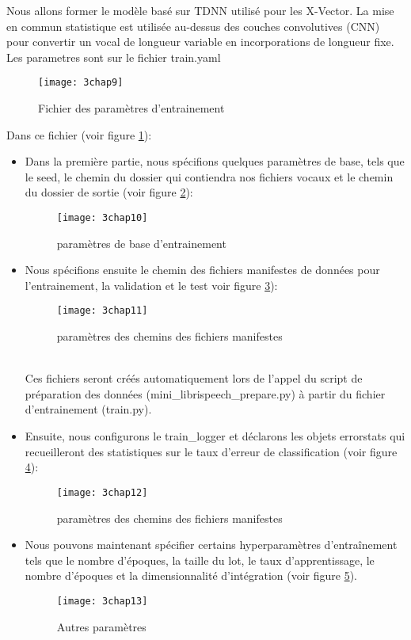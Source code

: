 Nous allons former le modèle basé sur TDNN utilisé pour les X-Vector. La mise en commun statistique est utilisée au-dessus des couches convolutives (CNN) pour convertir un vocal de longueur variable en incorporations de longueur fixe. Les parametres sont sur le fichier train.yaml

\begin{figure}[h]
    \centering
    \texttt{[image: 3chap9]}
    \caption{Fichier des paramètres d'entrainement}
    \label{fig:3chap9}
\end{figure}
Dans ce fichier  (voir figure \ref{fig:3chap9}):
\begin{itemize}
    \item Dans la première partie, nous spécifions quelques paramètres de base, tels que le seed, le chemin du dossier qui contiendra nos fichiers vocaux et le chemin du dossier de sortie (voir figure \ref{fig:3chap10}):
    \begin{figure}[h]
		\centering
		\texttt{[image: 3chap10]}
		\caption{paramètres de base d'entrainement}
		\label{fig:3chap10}
	\end{figure}
    \item Nous spécifions ensuite le chemin des fichiers manifestes de données pour l’entrainement, la validation et le test voir figure \ref{fig:3chap11}):
	\begin{figure}[h]
		\centering
		\texttt{[image: 3chap11]}
		\caption{paramètres des chemins des fichiers manifestes}
		\label{fig:3chap11}
	\end{figure}
	\\Ces fichiers seront créés automatiquement lors de l'appel du script de préparation des données (mini\_librispeech\_prepare.py) à partir du fichier d’entrainement (train.py).
	\item Ensuite, nous configurons le train\_logger et déclarons les objets error\textunderscore stats qui recueilleront des statistiques sur le taux d'erreur de classification (voir figure \ref{fig:3chap12}):
	\begin{figure}[h]
		\centering
		\texttt{[image: 3chap12]}
		\caption{paramètres des chemins des fichiers manifestes}
		\label{fig:3chap12}
	\end{figure}
	
	\item Nous pouvons maintenant spécifier certains hyperparamètres d'entraînement tels que le nombre d'époques, la taille du lot, le taux d'apprentissage, le nombre d'époques et la dimensionnalité d'intégration (voir figure \ref{fig:3chap13}).
	\begin{figure}[h]
		\centering
		\texttt{[image: 3chap13]}
		\caption{Autres paramètres}
		\label{fig:3chap13}
	\end{figure}

\end{itemize}

